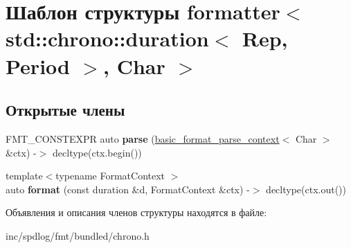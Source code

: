 \hypertarget{structformatter_3_01std_1_1chrono_1_1duration_3_01Rep_00_01Period_01_4_00_01Char_01_4}{}\section{Шаблон структуры formatter$<$ std\+:\+:chrono\+:\+:duration$<$ Rep, Period $>$, Char $>$}
\label{structformatter_3_01std_1_1chrono_1_1duration_3_01Rep_00_01Period_01_4_00_01Char_01_4}
\subsection*{Открытые члены}
\begin{DoxyCompactItemize}
\item 
\mbox{\label{structformatter_3_01std_1_1chrono_1_1duration_3_01Rep_00_01Period_01_4_00_01Char_01_4_a61336eae6a6e84dc63a367da3aaf91e8}} 
F\+M\+T\+\_\+\+C\+O\+N\+S\+T\+E\+X\+PR auto {\bfseries parse} (\hyperlink{classbasic__format__parse__context}{basic\+\_\+format\+\_\+parse\+\_\+context}$<$ Char $>$ \&ctx) -\/$>$ decltype(ctx.\+begin())
\item 
\mbox{\label{structformatter_3_01std_1_1chrono_1_1duration_3_01Rep_00_01Period_01_4_00_01Char_01_4_a8e85fb782f4dddcd3cb1fa207f2dd48c}} 
{\footnotesize template$<$typename Format\+Context $>$ }\\auto {\bfseries format} (const duration \&d, Format\+Context \&ctx) -\/$>$ decltype(ctx.\+out())
\end{DoxyCompactItemize}


Объявления и описания членов структуры находятся в файле\+:\begin{DoxyCompactItemize}
\item 
inc/spdlog/fmt/bundled/chrono.\+h\end{DoxyCompactItemize}
